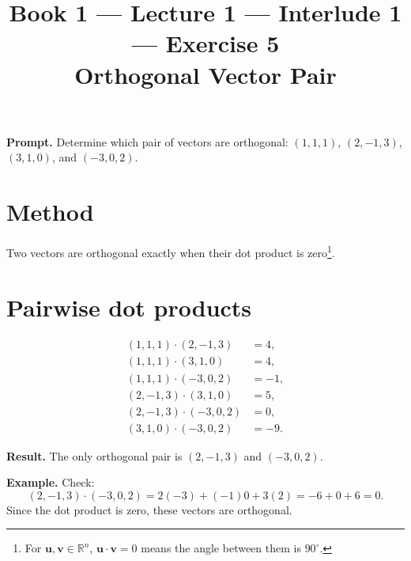 \documentclass[11pt]{article}
\title{\textbf{Book 1 --- Lecture 1 --- Interlude 1 --- Exercise 5}\\[2mm]
\large Orthogonal Vector Pair}
\author{}
\date{}
\newcommand{\promptbox}[1]{%
  \begingroup\setlength{\fboxsep}{10pt}\noindent
  \colorbox{blue!8}{\parbox{\dimexpr\linewidth-2\fboxsep\relax}{\textbf{Prompt. }#1}}
  \endgroup
}
\newcommand{\resultbox}[1]{%
  \begingroup\setlength{\fboxsep}{10pt}\noindent
  \colorbox{purple!8}{\parbox{\dimexpr\linewidth-2\fboxsep\relax}{\textbf{Result. }#1}}
  \endgroup
}
\newcommand{\examplebox}[1]{%
  \begingroup\setlength{\fboxsep}{10pt}\noindent
  \colorbox{green!8}{\parbox{\dimexpr\linewidth-2\fboxsep\relax}{\textbf{Example. }#1}}
  \endgroup
}
\begin{document}
\maketitle

\promptbox{Determine which pair of vectors are orthogonal:
\((1,1,1)\), \((2,-1,3)\), \((3,1,0)\), and \((-3,0,2)\).}

\section*{Method}
Two vectors are orthogonal exactly when their dot product is zero\footnote{For
\(\mathbf{u},\mathbf{v}\in\mathbb{R}^n\), \(\mathbf{u}\cdot\mathbf{v}=0\) means
the angle between them is \(90^\circ\).}.

\section*{Pairwise dot products}
\[
\begin{aligned}
(1,1,1)\cdot(2,-1,3) &= 4,\\
(1,1,1)\cdot(3,1,0) &= 4,\\
(1,1,1)\cdot(-3,0,2) &= -1,\\
(2,-1,3)\cdot(3,1,0) &= 5,\\
(2,-1,3)\cdot(-3,0,2) &= 0,\\
(3,1,0)\cdot(-3,0,2) &= -9.
\end{aligned}
\]

\resultbox{The only orthogonal pair is
\((2,-1,3)\) and \((-3,0,2)\).}

\examplebox{Check:
\[
(2,-1,3)\cdot(-3,0,2)=2(-3)+(-1)0+3(2)=-6+0+6=0.
\]
Since the dot product is zero, these vectors are orthogonal.}
\end{document}

